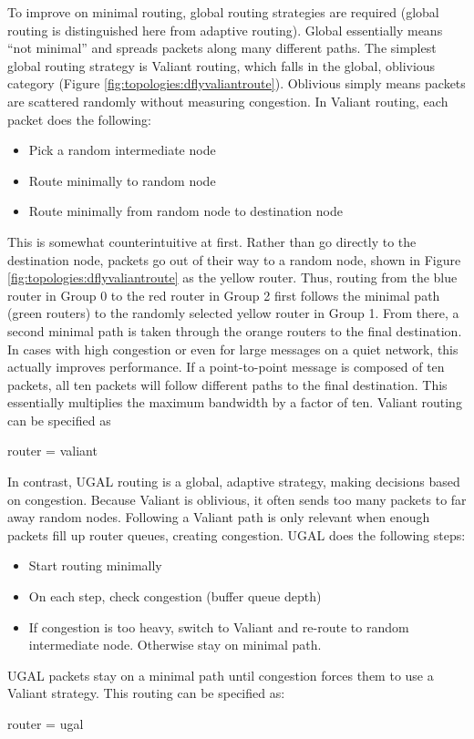 To improve on minimal routing, global routing strategies are required (global routing is distinguished here from adaptive routing).  
Global essentially means ``not minimal'' and spreads packets along many different paths.
The simplest global routing strategy is Valiant routing, which falls in the global, oblivious category (Figure \ref{fig:topologies:dflyvaliantroute}).
Oblivious simply means packets are scattered randomly without measuring congestion.
In Valiant routing, each packet does the following:
\begin{itemize}
\item Pick a random intermediate node 
\item Route minimally to random node
\item Route minimally from random node to destination node
\end{itemize}
This is somewhat counterintuitive at first.
Rather than go directly to the destination node, packets go out of their way to a random node, shown in Figure \ref{fig:topologies:dflyvaliantroute} as the yellow router.
Thus, routing from the blue router in Group 0 to the red router in Group 2 first follows the minimal path (green routers) to the randomly selected yellow router in Group 1. 
From there, a second minimal path is taken through the orange routers to the final destination.
In cases with high congestion or even for large messages on a quiet network, this actually improves performance.
If a point-to-point message is composed of ten packets,
all ten packets will follow different paths to the final destination.
This essentially multiplies the maximum bandwidth by a factor of ten.
Valiant routing can be specified as

\begin{ViFile}
router = valiant
\end{ViFile}

In contrast, UGAL routing is a global, adaptive strategy, making decisions based on congestion.
Because Valiant is oblivious, it often sends too many packets to far away random nodes.
Following a Valiant path is only relevant when enough packets fill up router queues, creating congestion.
UGAL does the following steps:
\begin{itemize}
\item Start routing minimally
\item On each step, check congestion (buffer queue depth)
\item If congestion is too heavy, switch to Valiant and re-route to random intermediate node. Otherwise stay on minimal path.
\end{itemize}
UGAL packets stay on a minimal path until congestion forces them to use a Valiant strategy.
This routing can be specified as:

\begin{ViFile}
router = ugal
\end{ViFile}

